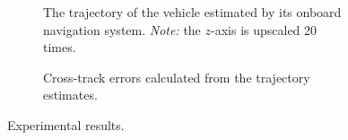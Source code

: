 \begin{figure}[t]
    \begin{subfigure}{0.48\textwidth}
        
        \caption{The trajectory of the vehicle estimated by its onboard navigation system. \emph{Note:} the $z$-axis is upscaled 20 times.}
        \label{fig:experiment_trajectory}
    \end{subfigure}        
    \begin{subfigure}{0.48\textwidth}
        
        \caption{Cross-track errors calculated from the trajectory estimates.}
        \label{fig:experiment_errors}
    \end{subfigure}
    \vspace*{-4mm}
    \caption{Experimental results.
    }
    \label{fig:experiment}
\end{figure}
